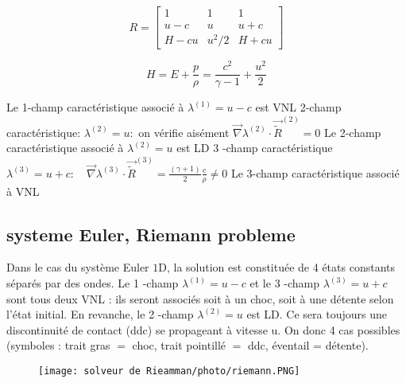\begin{equation}
R=\left[\begin{array}{ccc}
1 & 1 & 1 \\
u-c & u & u+c \\
H-c u & u^{2} / 2 & H+c u
\end{array}\right]
\end{equation}

\begin{equation}
H=E+\frac{p}{\rho}=\frac{c^{2}}{\gamma-1}+\frac{u^{2}}{2}
\end{equation}

Le 1-champ caractéristique associé à $\lambda^{(1)}=u-c$ est VNL
2-champ caractéristique: $\lambda^{(2)}=u:$ on vérifie aisément $\vec{\nabla} \lambda^{(2)} \cdot \overrightarrow{\widetilde{R}}^{(2)}=0$
Le 2-champ caractéristique associé à $\lambda^{(2)}=u$ est LD
3 -champ caractéristique $\lambda^{(3)}=u+c: \quad \vec{\nabla} \lambda^{(3)} \cdot \overrightarrow{\widetilde{R}}^{(3)}=\frac{(\gamma+1)}{2} \frac{c}{\rho} \neq 0$
Le 3-champ caractéristique associé à VNL

\subsection{systeme Euler, Riemann probleme}
Dans le cas du système Euler $1 \mathrm{D}$, la solution est constituée de 4 états constants séparés par des ondes. Le 1 -champ $\lambda^{(1)}=u-c$ et le 3 -champ $\lambda^{(3)}=u+c$ sont tous deux VNL : ils seront associés soit à un choc, soit à une détente selon l'état initial. En revanche, le 2 -champ $\lambda^{(2)}=u$ est LD. Ce sera toujours une discontinuité de contact (ddc) se propageant à vitesse
u. On donc 4 cas possibles (symboles : trait gras $=$ choc, trait pointillé $=$ ddc, éventail = détente).
\begin{figure}[H]
\begin{center}
        \texttt{[image: solveur de Rieamman/photo/riemann.PNG]}
\caption{}
\end{center}
\end{figure}

